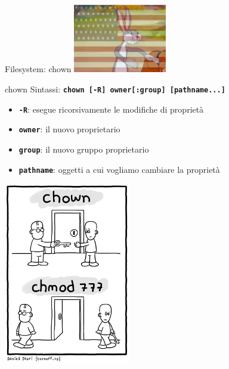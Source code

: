 \documentclass{beamer}
\begin{document}
    \begin{frame}{Filesystem: chown}
        \centering
        \includegraphics[height=3cm, keepaspectratio]{images/bugs-bunny-capitalist.png}
        \begin{block}{chown}
            \small
            Sintassi: \texttt{\textbf{chown [-R] owner[:group] [pathname...]}}

            \begin{itemize}
                \item \texttt{\textbf{-R}}: esegue ricorsivamente le modifiche di proprietà
                \item \texttt{\textbf{owner}}: il nuovo proprietario
                \item \texttt{\textbf{group}}: il nuovo gruppo proprietario
                \item \texttt{\textbf{pathname}}: oggetti a cui vogliamo cambiare la proprietà
            \end{itemize}
        \end{block}
    \end{frame}

    \begin{frame}{}
        \centering
        \includegraphics[height=8cm, keepaspectratio]{images/chown-chmod.png}
    \end{frame}
\end{document}
